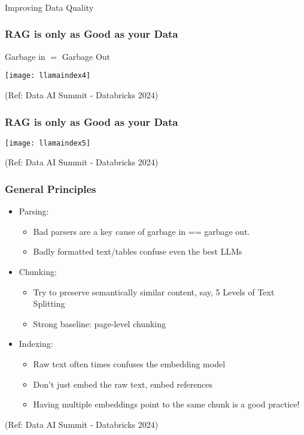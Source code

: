 \begin{frame}[fragile]\frametitle{}
\begin{center}
{\Large Improving Data Quality}
\end{center}
\end{frame}

\begin{frame}[fragile]\frametitle{RAG is only as Good as your Data}

Garbage in $=$ Garbage Out

\begin{center}
\texttt{[image: llamaindex4]}

{\tiny (Ref: Data AI Summit - Databricks 2024)}
\end{center}
\end{frame}


\begin{frame}[fragile]\frametitle{RAG is only as Good as your Data}


\begin{center}
\texttt{[image: llamaindex5]}

{\tiny (Ref: Data AI Summit - Databricks 2024)}
\end{center}
\end{frame}


\begin{frame}[fragile]\frametitle{General Principles}


\begin{itemize}
\item Parsing:
	\begin{itemize}
	\item Bad parsers are a key cause of garbage in == garbage out.
	\item Badly formatted text/tables confuse even the best LLMs
	\end{itemize}	
\item Chunking: 
	\begin{itemize}
	\item Try to preserve semantically similar content, say, 5 Levels of Text Splitting
	\item Strong baseline: page-level chunking
	\end{itemize}	
\item Indexing:
	\begin{itemize}
	\item Raw text often times confuses the embedding model
	\item Don’t just embed the raw text, embed references
	\item Having multiple embeddings point to the same chunk is a good practice! 
	\end{itemize}		
\end{itemize}	

{\tiny (Ref: Data AI Summit - Databricks 2024)}

\end{frame}

